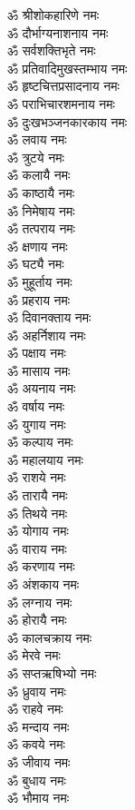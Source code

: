 \begin{multicols}{2}
\begin{flushleft}
ॐ श्रीशोकहारिणे नमः\\
ॐ दौर्भाग्यनाशनाय नमः\\
ॐ सर्वशक्तिभृते नमः\\
ॐ प्रतिवादिमुखस्तम्भाय नमः\\
ॐ हृष्टचित्तप्रसादनाय नमः\\
ॐ पराभिचारशमनाय नमः\\
ॐ दुःखभञ्जनकारकाय नमः\\
ॐ लवाय नमः\hfill{}\\
ॐ त्रुटये नमः\\
ॐ कलायै नमः\\
ॐ काष्ठायै नमः\\
ॐ निमेषाय नमः\\
ॐ तत्पराय नमः\\
ॐ क्षणाय नमः\\
ॐ घट्यै नमः\\
ॐ मुहूर्ताय नमः\\
ॐ प्रहराय नमः\\
ॐ दिवानक्ताय नमः\hfill{}\\
ॐ अहर्निशाय नमः\\
ॐ पक्षाय नमः\\
ॐ मासाय नमः\\
ॐ अयनाय नमः\\
ॐ वर्षाय नमः\\
ॐ युगाय नमः\\
ॐ कल्पाय नमः\\
ॐ महालयाय नमः\\
ॐ राशये नमः\\
ॐ तारायै नमः\hfill{}\\
ॐ तिथये नमः\\
ॐ योगाय नमः\\
ॐ वाराय नमः\\
ॐ करणाय नमः\\
ॐ अंशकाय नमः\\
ॐ लग्नाय नमः\\
ॐ होरायै नमः\\
ॐ कालचक्राय नमः\\
ॐ मेरवे नमः\\
ॐ सप्तऋषिभ्यो नमः\hfill{}\\
ॐ ध्रुवाय नमः\\
ॐ राहवे नमः\\
ॐ मन्दाय नमः\\
ॐ कवये नमः\\
ॐ जीवाय नमः\\
ॐ बुधाय नमः\\
ॐ भौमाय नमः\\

\end{flushleft}
\end{multicols}
